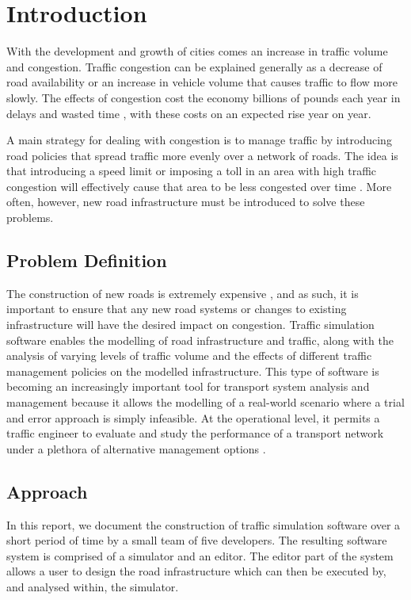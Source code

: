 \section{Introduction}
With the development and growth of cities comes an increase in traffic volume and congestion. Traffic congestion can be explained generally as a decrease of road availability or an increase in vehicle volume that causes traffic to flow more slowly. The effects of congestion cost the economy billions of pounds each year in delays and wasted time \cite{arnott1994economics,FinancialTimes}, with these costs on an expected rise year on year. 

A main strategy for dealing with congestion is to manage traffic by introducing road policies that spread traffic more evenly over a network of roads. The idea is that introducing a speed limit or imposing a toll in an area with high traffic congestion will effectively cause that area to be less congested over time \cite{TFLImpacts}. More often, however, new road infrastructure must be introduced to solve these problems.

\subsection*{Problem Definition}
The construction of new roads is extremely expensive \cite{BBC}, and as such, it is important to ensure that any new road systems or changes to existing infrastructure will have the desired impact on congestion. Traffic simulation software enables the modelling of road infrastructure and traffic, along with the analysis of varying levels of traffic volume and the effects of different traffic management policies on the modelled infrastructure. This type of software is becoming an increasingly important tool for transport system analysis and management because it allows the modelling of a real-world scenario where a trial and error approach is simply infeasible. At the operational level, it permits a traffic engineer to evaluate and study the performance of a transport network under a plethora of alternative management options \cite{hidas2002modelling}.

\subsection*{Approach}
In this report, we document the construction of traffic simulation software over a short period of time by a small team of five developers.
The resulting software system is comprised of a simulator and an editor. The editor part of the system allows a user to design the road infrastructure which can then be executed by, and analysed within, the simulator. 


